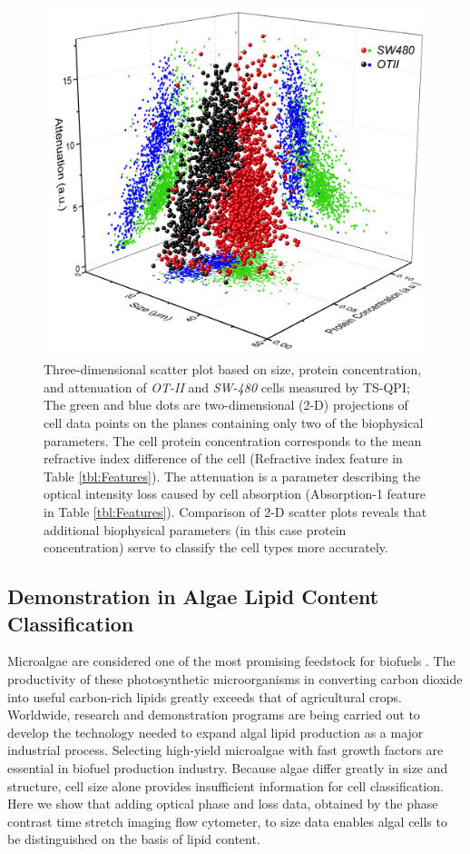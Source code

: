 \documentclass[aps,pra,reprint,longbibliography,superscriptaddress]{revtex4-1}
\begin{document}
\begin{figure}
\includegraphics[scale=0.2]{FigureOTSWScatter.jpg}
\caption{\label{fig:OTSWScatter} Three-dimensional scatter plot based on size, protein concentration, and attenuation of \textit{OT-II} and \textit{SW-480} cells measured by TS-QPI; The green and blue dots are two-dimensional (2-D) projections of cell data points on the planes containing only two of the biophysical parameters. The cell protein concentration corresponds to the mean refractive index difference of the cell (Refractive index feature in Table \ref{tbl:Features}). The attenuation is a parameter describing the optical intensity loss caused by cell absorption (Absorption-1 feature in Table \ref{tbl:Features}). Comparison of 2-D scatter plots reveals that additional biophysical parameters (in this case protein concentration) serve to classify the cell types more accurately.}
\end{figure}

\subsection{Demonstration in Algae Lipid Content Classification}

Microalgae are considered one of the most promising feedstock for biofuels \cite{merchant2012tag}. The productivity of these photosynthetic microorganisms in converting carbon dioxide into useful carbon-rich lipids greatly exceeds that of agricultural crops. Worldwide, research and demonstration programs are being carried out to develop the technology needed to expand algal lipid production as a major industrial process. Selecting high-yield microalgae with fast growth factors are essential in biofuel production industry. Because algae differ greatly in size and structure, cell size alone provides insufficient information for cell classification. Here we show that adding optical phase and loss data, obtained by the phase contrast time stretch imaging flow cytometer, to size data enables algal cells to be distinguished on the basis of lipid content. 
\end{document}

